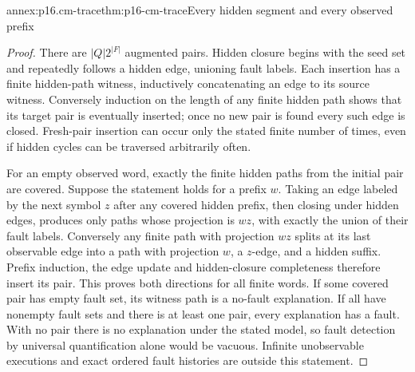 \begin{annexitem}{annex:p16.cm-trace}{thm:p16-cm-trace}{Every hidden segment and every observed prefix}
\begin{proof}
There are \(|Q|2^{|F|}\) augmented pairs. Hidden closure begins with
the seed set and repeatedly follows a hidden edge, unioning fault labels.
Each insertion has a finite hidden-path witness, inductively concatenating
an edge to its source witness. Conversely induction on the length of any
finite hidden path shows that its target pair is eventually inserted;
once no new pair is found every such edge is closed. Fresh-pair insertion
can occur only the stated finite number of times, even if hidden cycles
can be traversed arbitrarily often.

For an empty observed word, exactly the finite hidden paths from the initial
pair are covered. Suppose the statement holds for a prefix \(w\).
Taking an edge labeled by the next symbol \(z\) after any covered hidden
prefix, then closing under hidden edges, produces only paths whose
projection is \(wz\), with exactly the union of their fault labels.
Conversely any finite path with projection \(wz\) splits at its last
observable edge into a path with projection \(w\), a \(z\)-edge,
and a hidden suffix. Prefix induction, the edge update and hidden-closure
completeness therefore insert its pair. This proves both directions for
all finite words. If some covered pair has empty fault set, its witness
path is a no-fault explanation. If all have nonempty fault sets and there
is at least one pair, every explanation has a fault. With no pair there
is no explanation under the stated model, so fault detection by universal
quantification alone would be vacuous. Infinite unobservable executions
and exact ordered fault histories are outside this statement.
\end{proof}
\end{annexitem}

